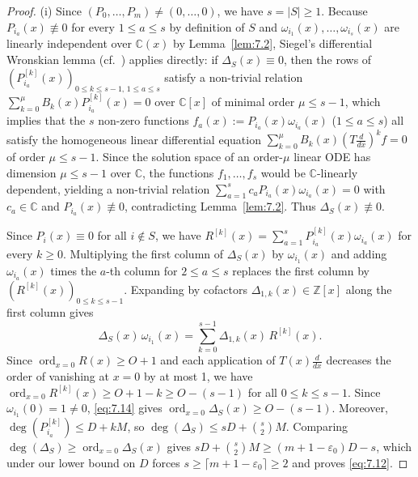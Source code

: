 \documentclass[11pt,reqno]{amsart}
\theoremstyle{remark}
\numberwithin{equation}{section}
\newcommand{\Z}{\mathbb{Z}}
\newcommand{\C}{\mathbb{C}}
\DeclareMathOperator{\ord}{ord}
\begin{document}
\begin{proof}
(i) Since $(P_0, \dots, P_m) \ne (0, \dots, 0)$, we have $s = |S| \ge 1$. Because $P_{i_a}(x) \not\equiv 0$ for every $1 \le a \le s$ by definition of $S$ and $\omega_{i_1}(x), \dots, \omega_{i_s}(x)$ are linearly independent over $\C(x)$ by Lemma~\ref{lem:7.2}, Siegel's differential Wronskian lemma \cite[Chapter~2, Lemma~4]{Siegel1949} (cf.\ \cite[Lemma~5.4]{BuiPrattZaharescu2023}) applies directly: if $\Delta_S(x) \equiv 0$, then the rows of $(P_{i_a}^{[k]}(x))_{0 \le k \le s-1,\, 1 \le a \le s}$ satisfy a non-trivial relation $\sum_{k=0}^\mu B_k(x) P_{i_a}^{[k]}(x) = 0$ over $\C[x]$ of minimal order $\mu \le s - 1$, which implies that the $s$ non-zero functions $f_a(x) := P_{i_a}(x)\omega_{i_a}(x)$ ($1 \le a \le s$) all satisfy the homogeneous linear differential equation $\sum_{k=0}^\mu B_k(x)(T\frac{d}{dx})^k f = 0$ of order $\mu \le s - 1$. Since the solution space of an order-$\mu$ linear ODE has dimension $\mu \le s - 1$ over $\C$, the functions $f_1, \dots, f_s$ would be $\C$-linearly dependent, yielding a non-trivial relation $\sum_{a=1}^s c_a P_{i_a}(x)\omega_{i_a}(x) = 0$ with $c_a \in \C$ and $P_{i_a}(x) \not\equiv 0$, contradicting Lemma~\ref{lem:7.2}. Thus $\Delta_S(x) \not\equiv 0$.

Since $P_i(x) \equiv 0$ for all $i \notin S$, we have $R^{[k]}(x) = \sum_{a=1}^s P_{i_a}^{[k]}(x)\omega_{i_a}(x)$ for every $k \ge 0$. Multiplying the first column of $\Delta_S(x)$ by $\omega_{i_1}(x)$ and adding $\omega_{i_a}(x)$ times the $a$-th column for $2 \le a \le s$ replaces the first column by $(R^{[k]}(x))_{0 \le k \le s-1}$. Expanding by cofactors $\Delta_{1,k}(x) \in \Z[x]$ along the first column gives
\begin{equation}\label{eq:7.14}
\Delta_S(x)\,\omega_{i_1}(x) = \sum_{k=0}^{s-1} \Delta_{1,k}(x)\,R^{[k]}(x).
\end{equation}
Since $\ord_{x=0} R(x) \ge O + 1$ and each application of $T(x)\frac{d}{dx}$ decreases the order of vanishing at $x = 0$ by at most 1, we have $\ord_{x=0} R^{[k]}(x) \ge O + 1 - k \ge O - (s - 1)$ for all $0 \le k \le s - 1$. Since $\omega_{i_1}(0) = 1 \ne 0$, \eqref{eq:7.14} gives $\ord_{x=0} \Delta_S(x) \ge O - (s - 1)$. Moreover, $\deg(P_{i_a}^{[k]}) \le D + kM$, so $\deg(\Delta_S) \le sD + \binom{s}{2}M$. Comparing $\deg(\Delta_S) \ge \ord_{x=0} \Delta_S(x)$ gives $sD + \binom{s}{2}M \ge (m + 1 - \varepsilon_0)D - s$, which under our lower bound on $D$ forces $s \ge \lceil m + 1 - \varepsilon_0 \rceil \ge 2$ and proves \eqref{eq:7.12}.


\end{proof}
\end{document}
